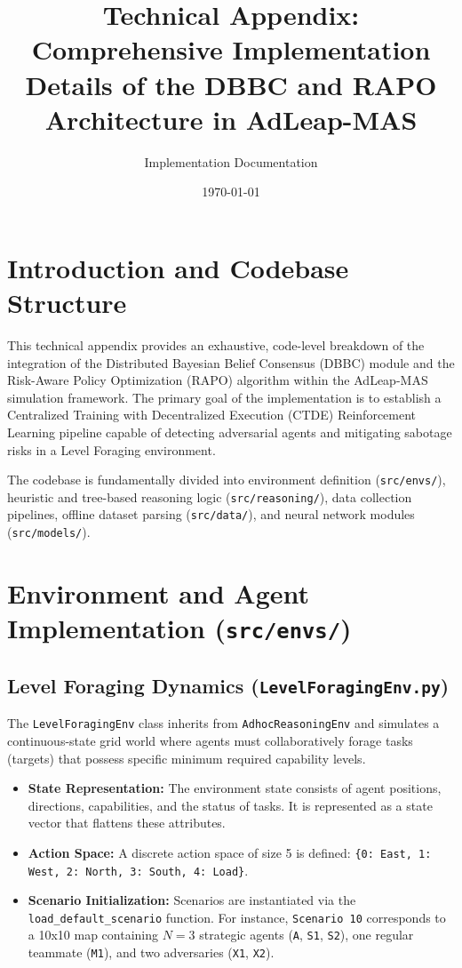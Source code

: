 \documentclass[11pt]{article}
\title{\textbf{Technical Appendix: Comprehensive Implementation Details of the DBBC and RAPO Architecture in AdLeap-MAS}}
\author{Implementation Documentation}
\date{\today}
\begin{document}
\maketitle

\tableofcontents
\newpage

\section{Introduction and Codebase Structure}
This technical appendix provides an exhaustive, code-level breakdown of the integration of the Distributed Bayesian Belief Consensus (DBBC) module and the Risk-Aware Policy Optimization (RAPO) algorithm within the AdLeap-MAS simulation framework. The primary goal of the implementation is to establish a Centralized Training with Decentralized Execution (CTDE) Reinforcement Learning pipeline capable of detecting adversarial agents and mitigating sabotage risks in a Level Foraging environment. 

The codebase is fundamentally divided into environment definition (\texttt{src/envs/}), heuristic and tree-based reasoning logic (\texttt{src/reasoning/}), data collection pipelines, offline dataset parsing (\texttt{src/data/}), and neural network modules (\texttt{src/models/}).

\section{Environment and Agent Implementation (\texttt{src/envs/})}
\subsection{Level Foraging Dynamics (\texttt{LevelForagingEnv.py})}
The \texttt{LevelForagingEnv} class inherits from \texttt{AdhocReasoningEnv} and simulates a continuous-state grid world where agents must collaboratively forage tasks (targets) that possess specific minimum required capability levels. 

\begin{itemize}
    \item \textbf{State Representation:} The environment state consists of agent positions, directions, capabilities, and the status of tasks. It is represented as a state vector that flattens these attributes. 
    \item \textbf{Action Space:} A discrete action space of size 5 is defined: \texttt{\{0: East, 1: West, 2: North, 3: South, 4: Load\}}. 
    \item \textbf{Scenario Initialization:} Scenarios are instantiated via the \texttt{load\_default\_scenario} function. For instance, \texttt{Scenario 10} corresponds to a 10x10 map containing $N=3$ strategic agents (\texttt{A}, \texttt{S1}, \texttt{S2}), one regular teammate (\texttt{M1}), and two adversaries (\texttt{X1}, \texttt{X2}).
\end{itemize}
\end{document}
